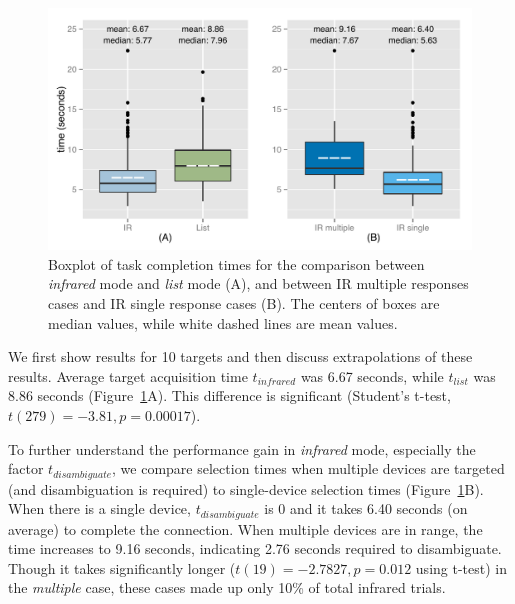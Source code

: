 \begin{figure}[t]
\centering
\includegraphics[width=1.0\columnwidth]{figures/R_time_by_Category.pdf}
\caption{Boxplot of task completion times for the comparison between {\em infrared} mode and {\em list} mode (A), and between IR multiple responses cases and IR single response cases (B). The centers of boxes are median values, while white dashed lines are mean values.}
\label{fig:selection-times}
\end{figure}

We first show results for 10 targets and then discuss extrapolations of these results. Average target acquisition time $t_{infrared}$ was 6.67 seconds, while $t_{list}$ was 8.86 seconds (Figure~\ref{fig:selection-times}A). This difference is significant (Student's t-test, $t(279)=-3.81, p=0.00017$). %

To further understand the performance gain in {\em infrared} mode, especially the factor $t_{disambiguate}$, we compare selection times when multiple devices are targeted (and disambiguation is required) to single-device selection times (Figure~\ref{fig:selection-times}B). When there is a single device, $t_{disambiguate}$ is 0 and it takes 6.40 seconds (on average) to complete the connection. When multiple devices are in range, the time increases to 9.16 seconds, indicating 2.76 seconds required to disambiguate. Though it takes significantly longer ($t(19)=-2.7827, p=0.012$ using t-test) in the {\em multiple} case, these cases made up only 10\% of total infrared trials.

